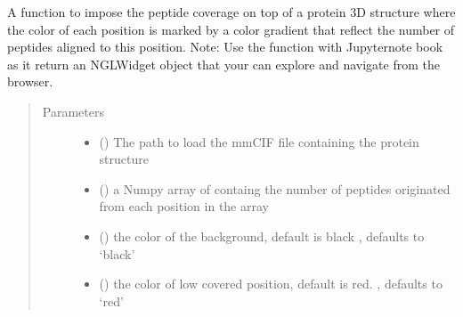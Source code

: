 \documentclass[letterpaper,10pt,english]{sphinxmanual}
\begin{document}
\begin{fulllineitems}
\label{\detokenize{IPTK.Visualization:IPTK.Visualization.vizTools.imposed_coverage_on_3D_structure}}
A function to impose the peptide coverage on top of a protein 3D structure     where the color of each position is marked by a color gradient that reflect the number of peptides 
aligned to this position. Note: Use the function with Jupyter\sphinxhyphen{}note book as it return an NGLWidget object that your can explore     and navigate from the browser.
\begin{quote}\begin{description}
\item[{Parameters}] \leavevmode\begin{itemize}
\item {} 
 () \textendash{} The path to load the mmCIF file containing the protein structure

\item {} 
 () \textendash{} a Numpy array of containg the number of peptides originated from each position in the array

\item {} 
 (\sphinxstyleliteralemphasis{\sphinxupquote{, }}) \textendash{} the color of the background, default is black , defaults to ‘black’

\item {} 
 (\sphinxstyleliteralemphasis{\sphinxupquote{, }}) \textendash{} the color of low covered position, default is red. , defaults to ‘red’


\end{itemize}
\end{description}
\end{quote}
\end{fulllineitems}
\end{document}
